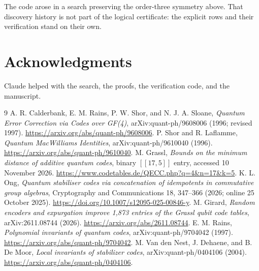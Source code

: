 \documentclass[11pt]{article}
\begin{document}
The code arose in a search preserving the order-three symmetry above. That discovery history is not part of the logical certificate: the explicit rows and their verification stand on their own.

\section*{Acknowledgments}
Claude helped with the search, the proofs, the verification code, and the
manuscript.

\begin{thebibliography}{9}
 A. R. Calderbank, E. M. Rains, P. W. Shor, and N. J. A. Sloane,
\emph{Quantum Error Correction via Codes over GF(4)}, arXiv:quant-ph/9608006 (1996; revised 1997). \url{https://arxiv.org/abs/quant-ph/9608006}.
 P. Shor and R. Laflamme, \emph{Quantum MacWilliams Identities}, arXiv:quant-ph/9610040 (1996). \url{https://arxiv.org/abs/quant-ph/9610040}.
 M. Grassl, \emph{Bounds on the minimum distance of additive quantum codes}, binary $[[17,5]]$ entry, accessed 10 November 2026. \url{https://www.codetables.de/QECC.php?q=4&n=17&k=5}.
 K. L. Ong, \emph{Quantum stabiliser codes via concatenation of idempotents in commutative group algebras}, Cryptography and Communications 18, 347--366 (2026; online 25 October 2025). \url{https://doi.org/10.1007/s12095-025-00846-y}.
 M. Girard, \emph{Random encoders and expurgation improve 1,873 entries of the Grassl qubit code tables}, arXiv:2611.08744 (2026). \url{https://arxiv.org/abs/2611.08744}.
 E. M. Rains, \emph{Polynomial invariants of quantum codes}, arXiv:quant-ph/9704042 (1997). \url{https://arxiv.org/abs/quant-ph/9704042}.
 M. Van den Nest, J. Dehaene, and B. De Moor, \emph{Local invariants of stabilizer codes}, arXiv:quant-ph/0404106 (2004). \url{https://arxiv.org/abs/quant-ph/0404106}.
\end{thebibliography}
\end{document}
